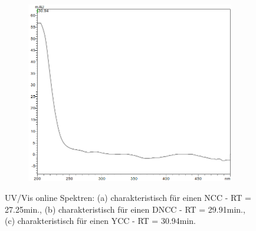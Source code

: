 \begin{figure}[!htbp]
  \begin{subfigure}[b]{0.5\textwidth}
    \includegraphics[width=\textwidth]{figures/Kapitel6/keineReaktion/YCC3094.png}
    \caption{}
    \label{fig:DNCC2991}
  \end{subfigure}
  \caption[UV/Vis online Spektren mit der Charakteristik eines NCC bei 27.10min., eines DNCC bei 29.75min. sowie eines YCC bei 30.94min., Quelle: Author]{UV/Vis online Spektren: (a) charakteristisch für einen \gls{NCC} - RT = 27.25min., (b) charakteristisch für einen \gls{DNCC} - RT = 29.91min., (c) charakteristisch für einen \gls{YCC} - RT = 30.94min.}
\end{figure}
